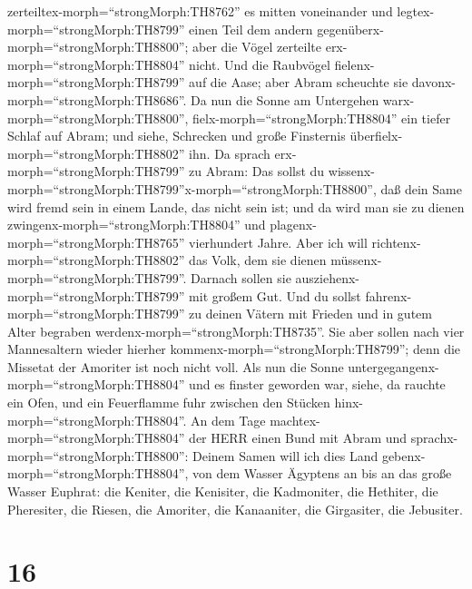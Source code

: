 zerteiltex-morph=``strongMorph:TH8762'' es mitten voneinander und
legtex-morph=``strongMorph:TH8799'' einen Teil dem andern
gegenüberx-morph=``strongMorph:TH8800''; aber die Vögel zerteilte
erx-morph=``strongMorph:TH8804'' nicht.  Und die Raubvögel
fielenx-morph=``strongMorph:TH8799'' auf die Aase; aber Abram scheuchte
sie davonx-morph=``strongMorph:TH8686''.  Da nun die Sonne
am Untergehen warx-morph=``strongMorph:TH8800'',
fielx-morph=``strongMorph:TH8804'' ein tiefer Schlaf auf Abram; und
siehe, Schrecken und große Finsternis
überfielx-morph=``strongMorph:TH8802'' ihn.  Da sprach
erx-morph=``strongMorph:TH8799'' zu Abram: Das sollst du
wissenx-morph=``strongMorph:TH8799''x-morph=``strongMorph:TH8800'', daß
dein Same wird fremd sein in einem Lande, das nicht sein ist; und da
wird man sie zu dienen zwingenx-morph=``strongMorph:TH8804'' und
plagenx-morph=``strongMorph:TH8765'' vierhundert Jahre. 
Aber ich will richtenx-morph=``strongMorph:TH8802'' das Volk, dem sie
dienen müssenx-morph=``strongMorph:TH8799''. Darnach sollen sie
ausziehenx-morph=``strongMorph:TH8799'' mit großem Gut. 
Und du sollst fahrenx-morph=``strongMorph:TH8799'' zu deinen Vätern mit
Frieden und in gutem Alter begraben
werdenx-morph=``strongMorph:TH8735''.  Sie aber sollen nach
vier Mannesaltern wieder hierher kommenx-morph=``strongMorph:TH8799'';
denn die Missetat der Amoriter ist noch nicht voll.  Als
nun die Sonne untergegangenx-morph=``strongMorph:TH8804'' und es finster
geworden war, siehe, da rauchte ein Ofen, und ein Feuerflamme fuhr
zwischen den Stücken hinx-morph=``strongMorph:TH8804''.  An
dem Tage machtex-morph=``strongMorph:TH8804'' der HERR einen Bund mit
Abram und sprachx-morph=``strongMorph:TH8800'': Deinem Samen will ich
dies Land gebenx-morph=``strongMorph:TH8804'', von dem Wasser Ägyptens
an bis an das große Wasser Euphrat:  die Keniter, die
Kenisiter, die Kadmoniter,  die Hethiter, die Pheresiter,
die Riesen,  die Amoriter, die Kanaaniter, die Girgasiter,
die Jebusiter.

\hypertarget{section-15}{%
\section{16}\label{section-15}}

